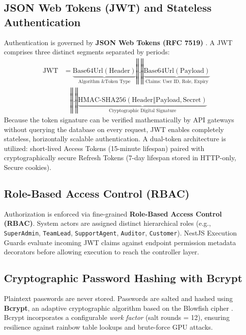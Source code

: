 \subsection{JSON Web Tokens (JWT) and Stateless Authentication}
Authentication is governed by \textbf{JSON Web Tokens (RFC 7519)} \citep{rfc7519jwt}. A JWT comprises three distinct segments separated by periods:
\begin{align}
    \text{JWT} &= \underbrace{\text{Base64Url}(\text{Header})}_{\text{Algorithm \& Token Type}} \mathbin{\Vert} \text{.} \mathbin{\Vert} \underbrace{\text{Base64Url}(\text{Payload})}_{\text{Claims: User ID, Role, Expiry}} \nonumber \\
    &\quad \mathbin{\Vert} \text{.} \mathbin{\Vert} \underbrace{\text{HMAC-SHA256}(\text{Header} \mathbin{\Vert} \text{Payload}, \text{Secret})}_{\text{Cryptographic Digital Signature}}
\end{align}
Because the token signature can be verified mathematically by API gateways without querying the database on every request, JWT enables completely stateless, horizontally scalable authentication. A dual-token architecture is utilized: short-lived Access Tokens (15-minute lifespan) paired with cryptographically secure Refresh Tokens (7-day lifespan stored in HTTP-only, Secure cookies).

\subsection{Role-Based Access Control (RBAC)}
Authorization is enforced via fine-grained \textbf{Role-Based Access Control (RBAC)}. System actors are assigned distinct hierarchical roles (e.g., \texttt{SuperAdmin}, \texttt{TeamLead}, \texttt{SupportAgent}, \texttt{Auditor}, \texttt{Customer}). NestJS Execution Guards evaluate incoming JWT claims against endpoint permission metadata decorators before allowing execution to reach the controller layer.

\subsection{Cryptographic Password Hashing with Bcrypt}
Plaintext passwords are never stored. Passwords are salted and hashed using \textbf{Bcrypt}, an adaptive cryptographic algorithm based on the Blowfish cipher \citep{provos1999future}. Bcrypt incorporates a configurable \textit{work factor} (salt rounds = 12), ensuring resilience against rainbow table lookups and brute-force GPU attacks.

